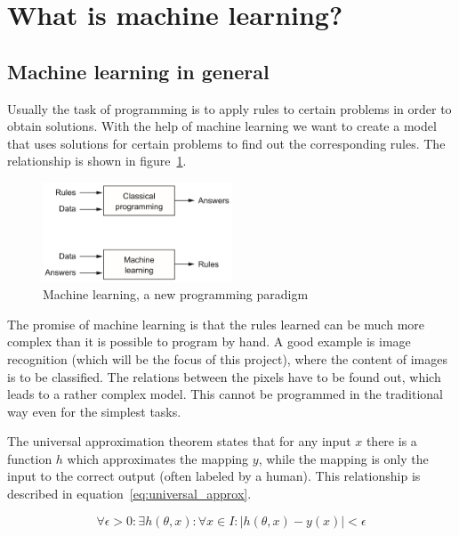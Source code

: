 \section{What is machine learning?} \label{ch:what_is_ml}

\subsection{Machine learning in general}

Usually the task of programming is to apply rules to certain problems in order to obtain solutions.
With the help of machine learning we want to create a model that uses solutions for certain problems to find out the corresponding rules.
The relationship is shown in figure~\ref{fig:cp_vs_ml}.

\begin{figure}
    \centering
    \includegraphics[width=0.5\textwidth]{images/classical_prog_vs_ml.png}
    \caption{Machine learning, a new programming paradigm \cite[p.5]{Chollet2017}}
    \label{fig:cp_vs_ml}
\end{figure}

The promise of machine learning is that the rules learned can be much more complex than it is possible to program by hand.
A good example is image recognition (which will be the focus of this project), where the content of images is to be classified.
The relations between the pixels have to be found out, which leads to a rather complex model.
This cannot be programmed in the traditional way even for the simplest tasks.

The universal approximation theorem \cite{Cybenko1989, Hornik1989} states that for any input $x$ there is a function $h$ which approximates the mapping $y$, while the mapping is only the input to the correct output (often labeled by a human).
This relationship is described in equation~\eqref{eq:universal_approx}.

\begin{equation}
    \forall \epsilon > 0 :
    \exists h(\theta, x) : \forall x \in I : | h(\theta, x) - y(x) | < \epsilon
    \label{eq:universal_approx}
\end{equation}

